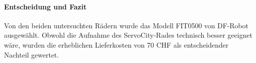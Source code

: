 \documentclass[main.tex]{subfiles} %
\begin{document}
\paragraph{Entscheidung und Fazit}
Von den beiden untersuchten Rädern wurde das Modell FIT0500 von DF-Robot ausgewählt. 
Obwohl die Aufnahme des ServoCity-Rades technisch besser geeignet wäre, wurden die 
erheblichen Lieferkosten von 70 CHF als entscheidender Nachteil gewertet.
\end{document}
